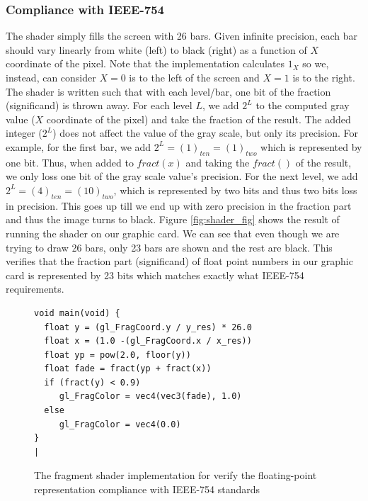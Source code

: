 \subsubsection{Compliance with IEEE-754}
The shader simply fills the screen with 26 bars. Given infinite precision, each bar should vary linearly from white (left) to black (right) as a function of $X$ coordinate of the pixel. Note that the implementation calculates $1_X$ so we, instead, can consider $X=0$ is to the left of the screen and $X=1$ is to the right. The shader is written such that with each level/bar, one bit of the fraction (significand) is thrown away. For each level $L$, we add $2^{L}$ to the computed gray value ($X$ coordinate of the pixel) and take the fraction of the result. The added integer ($2^{L}$) does not affect the value of the gray scale, but only its precision. For example, for the first bar, we add  $2^{L}=(1)_{ten}=(1)_{two}$ which is represented by one bit. Thus, when added to $fract(x)$ and taking the $fract()$ of the result, we only loss one bit of the gray scale value's precision. For the next level, we add $2^{L}=(4)_{ten}=(10)_{two}$, which is represented by two bits and thus two bits loss in precision. This goes up till we end up with zero precision in the fraction part and thus the image turns to black. Figure \ref{fig:shader_fig} shows the result of running the shader on our graphic card. We can see that even though we are trying to draw 26 bars, only 23 bars are shown and the rest are black. This verifies that the fraction part (significand) of float point numbers in our graphic card is represented by 23 bits which matches exactly what IEEE-754 requirements. 

\begin{figure}[t!]
\centering
\begin{minipage}[t]{\textwidth}
\centering
\begin{lstlisting}[label=list:ExampleShader,
escapechar=|,
caption={
  Fragment Shader.
}]
void main(void) {
  float y = (gl_FragCoord.y / y_res) * 26.0
  float x = (1.0 -(gl_FragCoord.x / x_res))
  float yp = pow(2.0, floor(y))
  float fade = fract(yp + fract(x))
  if (fract(y) < 0.9)
     gl_FragColor = vec4(vec3(fade), 1.0)
  else
     gl_FragColor = vec4(0.0)
}
|
\end{lstlisting}
\end{minipage}

\caption{The fragment shader implementation for verify the floating-point representation compliance with IEEE-754 standards}
\label{fig:shader_code}
\end{figure}


